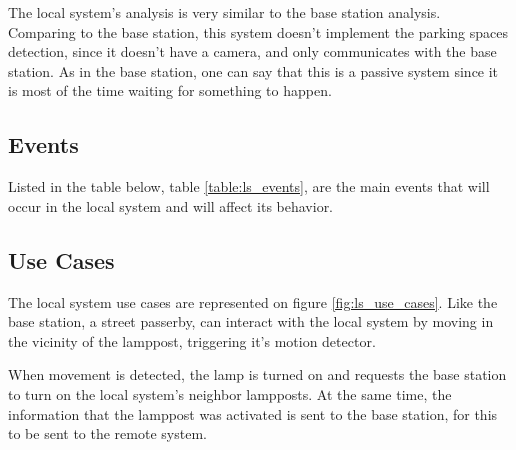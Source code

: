 The local system's analysis is very similar to the base station analysis. Comparing to the base station, this system doesn't implement the parking spaces detection, since it doesn't have a camera, and only communicates with the base station. As in the base station, one can say that this is a passive system since it is most of the time waiting for something to happen.

\subsection{Events}
Listed in the table below, table \ref{table:ls_events}, are the main events that will occur in the local system and will affect its behavior. 

\begin{table}[h]
	\centering
	
	\caption{Local system events.}
	\label{table:ls_events}
\end{table}

\subsection{Use Cases}
The local system use cases are represented on figure \ref{fig:ls_use_cases}. Like the base station, a street passerby, can interact with the local system by moving in the vicinity of the lamppost, triggering it's motion detector.

When movement is detected, the lamp is turned on and requests the base station to turn on the local system's neighbor lampposts. At the same time, the information that the lamppost was activated is sent to the base station, for this to be sent to the remote system.

